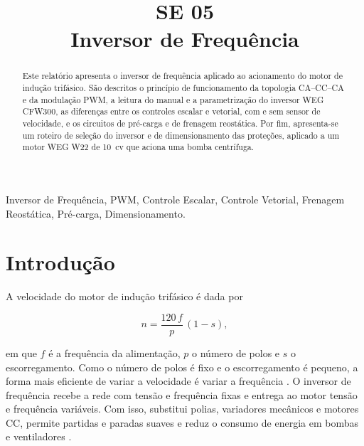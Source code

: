 \documentclass[conference]{IEEEtran}
\begin{document}
\raggedbottom

\title{SE 05\\Inversor de Frequência}

\author{
}

\maketitle

\begin{abstract}
Este relatório apresenta o inversor de frequência aplicado ao acionamento do motor de indução trifásico. São descritos o princípio de funcionamento da topologia CA--CC--CA e da modulação PWM, a leitura do manual e a parametrização do inversor WEG CFW300, as diferenças entre os controles escalar e vetorial, com e sem sensor de velocidade, e os circuitos de pré-carga e de frenagem reostática. Por fim, apresenta-se um roteiro de seleção do inversor e de dimensionamento das proteções, aplicado a um motor WEG W22 de 10~cv que aciona uma bomba centrífuga.
\end{abstract}

\begin{IEEEkeywords}
Inversor de Frequência, PWM, Controle Escalar, Controle Vetorial, Frenagem Reostática, Pré-carga, Dimensionamento.
\end{IEEEkeywords}

\section{Introdução}

A velocidade do motor de indução trifásico é dada por

\begin{equation}
    n=\frac{120\,f}{p}\,(1-s),
\end{equation}

em que $f$ é a frequência da alimentação, $p$ o número de polos e $s$ o escorregamento. Como o número de polos é fixo e o escorregamento é pequeno, a forma mais eficiente de variar a velocidade é variar a frequência \cite{b1}. O inversor de frequência recebe a rede com tensão e frequência fixas e entrega ao motor tensão e frequência variáveis. Com isso, substitui polias, variadores mecânicos e motores CC, permite partidas e paradas suaves e reduz o consumo de energia em bombas e ventiladores \cite{b2}.
\end{document}
